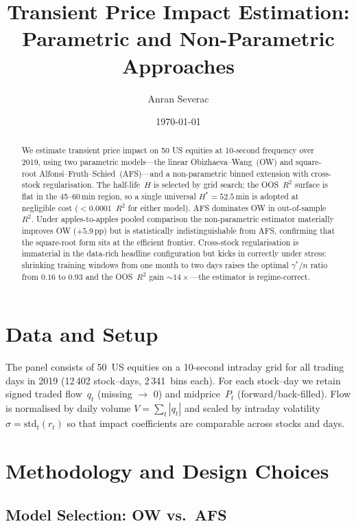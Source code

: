\documentclass[11pt,a4paper]{article}
\title{Transient Price Impact Estimation:\\
       Parametric and Non-Parametric Approaches}
\author{Anran Severac}
\date{\today}
\begin{document}
\maketitle

\begin{abstract}
\noindent
We estimate transient price impact on 50 US equities at 10-second
frequency over 2019, using two parametric models---the linear
Obizhaeva--Wang~(OW) and square-root Alfonsi--Fruth--Schied~(AFS)---and
a non-parametric binned extension with cross-stock regularisation.
The half-life~$H$ is selected by grid search; the OOS~$R^2$ surface is
flat in the 45--60\,min region, so a single universal $H^*\!=\!52.5$\,min
is adopted at negligible cost ($<\!0.0001$~$R^2$ for either model).
AFS dominates OW in out-of-sample~$R^2$.  Under apples-to-apples
pooled comparison the non-parametric estimator materially improves OW
($+5.9$\,pp) but is statistically indistinguishable from AFS,
confirming that the square-root form sits at the efficient frontier.
Cross-stock regularisation is immaterial in the data-rich headline
configuration but kicks in correctly under stress: shrinking training
windows from one month to two days raises the optimal $\gamma^*/n$
ratio from $0.16$ to $0.93$ and the OOS~$R^2$ gain
${\sim}14\times$---the estimator is regime-correct.
\end{abstract}

\section{Data and Setup}

The panel consists of 50~US equities on a 10-second intraday grid for
all trading days in 2019 (12\,402 stock--days, 2\,341~bins each).  For
each stock--day we retain signed traded flow~$q_t$ (missing $\to$ 0) and
midprice~$P_t$ (forward/back-filled).  Flow is normalised by daily
volume $V=\sum_t|q_t|$ and scaled by intraday volatility
$\sigma=\mathrm{std}_t(r_t)$ so that impact coefficients are comparable
across stocks and days.

\section{Methodology and Design Choices}

\subsection{Model Selection: OW vs.\ AFS}
\end{document}
